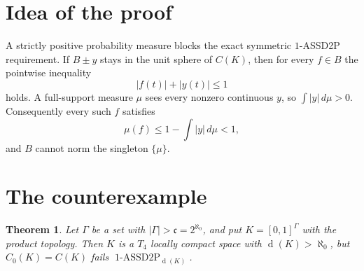 \documentclass[11pt]{amsart}
\newtheorem{theorem}{Theorem}
\theoremstyle{remark}
\DeclareMathOperator{\dens}{d}
\DeclareMathOperator{\ASSD}{1\mbox{-}ASSD2P}
\newcommand{\cardc}{\mathfrak c}
\begin{document}
\section*{Idea of the proof}

A strictly positive probability measure blocks the exact symmetric
$1$-ASSD2P requirement.  If $B\pm y$ stays in the unit sphere of $C(K)$, then
for every $f\in B$ the pointwise inequality
\[
        |f(t)|+|y(t)|\le 1
\]
holds.  A full-support measure $\mu$ sees every nonzero continuous $y$, so
$\int |y|\,d\mu>0$.  Consequently every such $f$ satisfies
\[
        \mu(f)\le 1-\int |y|\,d\mu < 1,
\]
and $B$ cannot norm the singleton $\{\mu\}$.

\section*{The counterexample}

\begin{theorem}
Let $\Gamma$ be a set with $|\Gamma|>\cardc=2^{\aleph_0}$, and put
$K=[0,1]^\Gamma$ with the product topology.  Then $K$ is a $T_4$ locally
compact space with $\dens(K)>\aleph_0$, but $C_0(K)=C(K)$ fails
$\ASSD_{\dens(K)}$.
\end{theorem}
\end{document}
